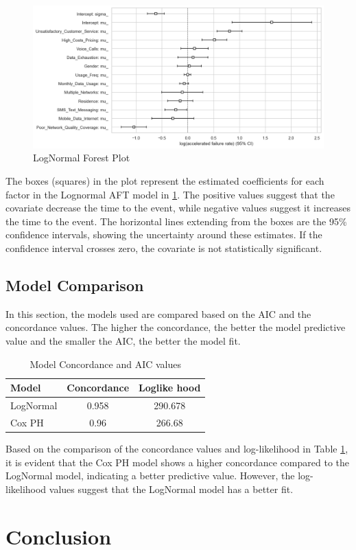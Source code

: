 \documentclass[doublespacing]{report} [12px]%
\begin{document}
\begin{figure}[H]
    \centering
    \includegraphics[width=0.8\linewidth]{Figure 4/4.4.png}
    \caption{LogNormal Forest Plot}
    \label{LogNormal}
\end{figure}

The boxes (squares) in the plot represent the estimated coefficients for each factor in the Lognormal AFT model in \ref{LogNormal}. The positive values suggest that the covariate decrease the time to the event, while negative values suggest it increases the time to the event. The horizontal lines extending from the boxes are the 95\% confidence intervals, showing the uncertainty around these estimates. If the confidence interval crosses zero, the covariate is not statistically significant.

\section{Model Comparison}

In this section, the models used are compared based on the AIC and the concordance values. The higher the concordance, the better the model predictive value and the smaller the AIC, the better the model fit.

	\begin{table}[H]
			\centering
			\begin{tabular}{lcc}
				\toprule
				\textbf{Model} & \textbf{Concordance} & \textbf{Loglike hood}\\
				\midrule
				LogNormal& 0.958& 	290.678\\
				Cox PH & 0.96& 	266.68\\
				\bottomrule
			\end{tabular}
			\caption{Model Concordance and AIC values}
			\label{Table 2}
			
		\end{table}

Based on the comparison of the concordance values and log-likelihood in Table \ref{Table 2}, it is evident that the Cox PH model shows a higher concordance compared to the LogNormal model, indicating a better predictive value. However, the log-likelihood values suggest that the LogNormal model has a better fit. 

\newpage
\chapter{Conclusion}




\end{document}
